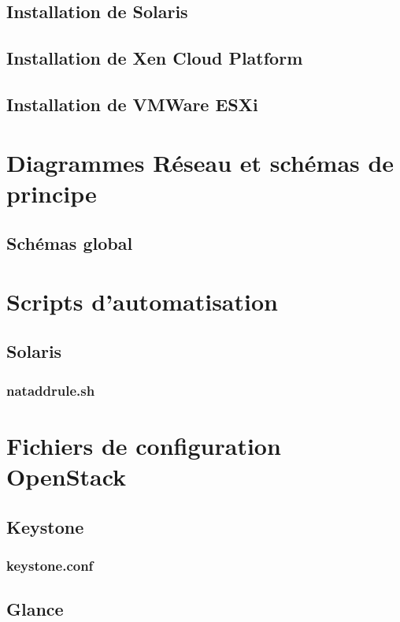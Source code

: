 \documentclass[a4paper,oneside]{report}
\begin{document}
\section{Installation de Solaris}

\section{Installation de Xen Cloud Platform}

\section{Installation de VMWare ESXi}

\chapter{Diagrammes Réseau et schémas de principe}
\section{Schémas global} \label{sch:glob}

\chapter{Scripts d'automatisation}
\section{Solaris}
\subsection{nataddrule.sh}

\chapter{Fichiers de configuration OpenStack}
\section{Keystone}
\subsection{keystone.conf}

\section{Glance}
\end{document}
